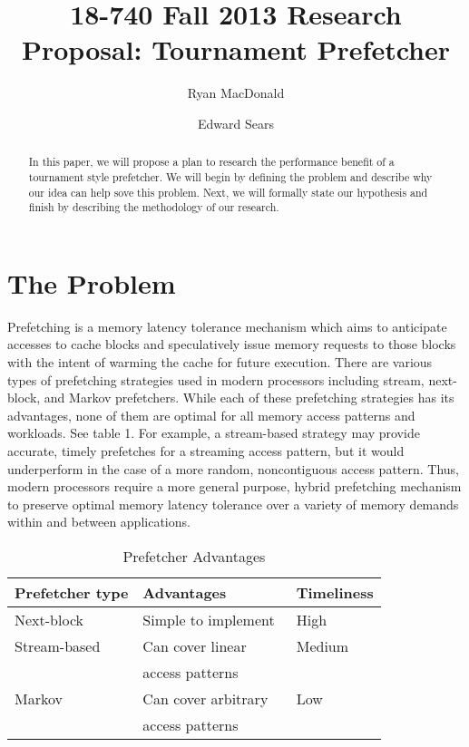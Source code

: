 \documentclass[pageno]{jpaper}
\begin{document}
\title{
18-740 Fall 2013 Research Proposal: Tournament Prefetcher}
\author{Ryan MacDonald \and Edward Sears}

\date{}
\maketitle

\thispagestyle{empty}

\begin{abstract}
In this paper, we will propose a plan to research the performance benefit of 
a tournament style prefetcher. We will begin by defining the problem
and describe why our idea can help sove this problem.  Next, we will formally
state our hypothesis and finish by describing the methodology of our research.
\end{abstract}

\section{The Problem}

Prefetching is a memory latency tolerance mechanism which aims to anticipate 
accesses to cache blocks and speculatively issue memory requests to those blocks with 
the intent of warming the cache for future execution. There are various types of prefetching 
strategies used in modern processors including stream, next-block, and Markov prefetchers. 
While each of these prefetching strategies has its advantages, none of them are optimal 
for all memory access patterns and workloads. See table 1. For example, a stream-based strategy may 
provide accurate, timely prefetches for a streaming access pattern, but it would underperform 
in the case of a more random, noncontiguous access pattern. Thus, modern processors require 
a more general purpose, hybrid prefetching mechanism to preserve optimal memory latency 
tolerance over a variety of memory demands within and between applications.


\begin{table}[h!]
  \centering
  \begin{tabular}{|l|l|l|}
    \hline
    \textbf{Prefetcher type} & \textbf{Advantages} & \textbf{Timeliness}\\
    \hline
    \hline
     Next-block& Simple to implement~\cite{mutlu13} & High\\
    \hline
    Stream-based & Can cover linear & Medium\\
         & access patterns~\cite{mutlu13} & \\
    \hline
    Markov & Can cover arbitrary& Low\\
         & access patterns~\cite{mutlu13} & \\
    \hline
  \end{tabular}
  \caption{Prefetcher Advantages}
  \label{table:formatting}
\end{table}
\end{document}
